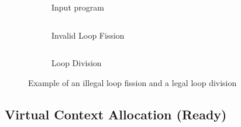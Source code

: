 \begin{figure}
\centering
\begin{subfigure}[b]{0.28\textwidth}
\inputminted{python}{code/loopexp2.py}
\caption{Input program}
\end{subfigure}
\hfill
\begin{subfigure}[b]{0.32\textwidth}
\inputminted{python}{code/loopexp2fission.py}
\caption{Invalid Loop Fission}
\end{subfigure}
\hfill
\begin{subfigure}[b]{0.31\textwidth}
\inputminted{python}{code/loopexp2division.py}
\caption{Loop Division}
\end{subfigure}
\caption[Example of an illegal loop fission and a legal loop division]{
Example of an illegal loop fission and a legal loop division
}
\label{fig:loopexp2}
\end{figure}

\subsection{Virtual Context Allocation (Ready)} 

